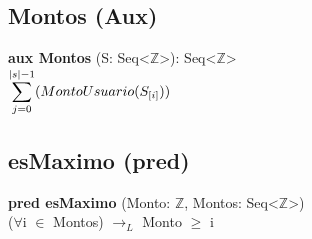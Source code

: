 \documentclass{article}
\begin{document}
\subsection{Montos (Aux)}
\textbf{aux Montos} (S: Seq\textless$\mathds{Z}$\textgreater): Seq\textless$\mathds{Z}$\textgreater \\
$\mathlarger\sum\limits_{j=0}^{|s|-1} (MontoUsuario(S_{[i]}))$


\subsection{esMaximo (pred)}
\textbf{pred esMaximo} (Monto: $\mathds{Z}$, Montos: Seq\textless$\mathds{Z}$\textgreater)\\
($\forall$i $\in$ Montos) $\rightarrow_L$ Monto $\geq$ i
\end{document}
